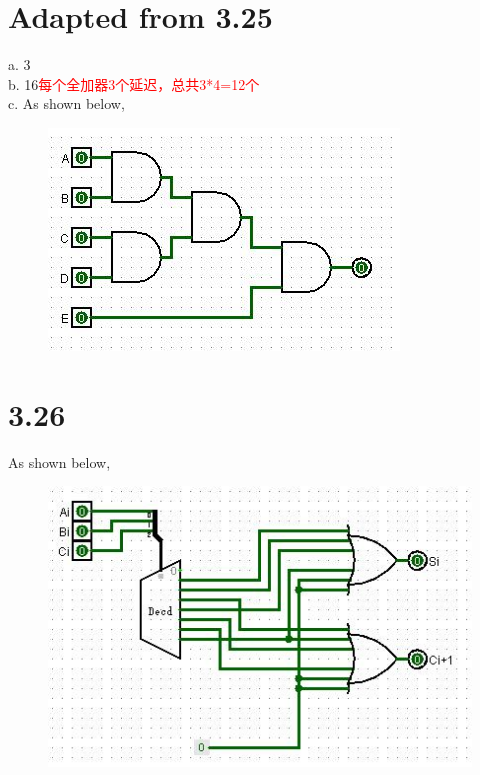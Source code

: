 \documentclass[11pt,a4paper]{article}
\begin{document}
	\section{Adapted from 3.25}
	a. 3\\
	b. 16\qquad \textcolor{red}{每个全加器3个延迟，总共3*4=12个}\\
	c. As shown below,
	\begin{figure}[H]
		\centering
		\includegraphics[width=1\linewidth]{5_c.jpg}
		\label{5_c}
	\end{figure}
	
	\section{3.26}
	As shown below,
	\begin{figure}[H]
		\centering
		\includegraphics[width=1\linewidth]{6.jpg}
		\label{6}
	\end{figure}
\end{document}
